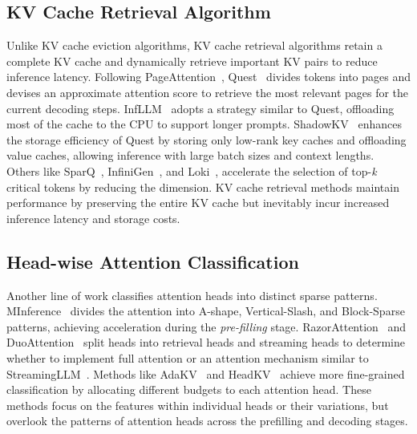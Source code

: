 \subsection{KV Cache Retrieval Algorithm}
Unlike KV cache eviction algorithms, KV cache retrieval algorithms retain a complete KV cache and dynamically retrieve important KV pairs to reduce inference latency. 
Following PageAttention~\cite{vllm}, Quest~\cite{quest} divides tokens into pages and devises an approximate attention score to retrieve the most relevant pages for the current decoding steps.
InfLLM~\cite{infllm} adopts a strategy similar to Quest, offloading most of the cache to the CPU to support longer prompts.
ShadowKV~\cite{shadowkv} enhances the storage efficiency of Quest by storing only low-rank key caches and offloading value caches, allowing inference with large batch sizes and context lengths.
Others like SparQ~\cite{sparq}, InfiniGen~\cite{infinigen}, and Loki~\cite{loki}, accelerate the selection of top-\textit{k} critical tokens by reducing the dimension. 
KV cache retrieval methods maintain performance by preserving the entire KV cache but inevitably incur increased inference latency and storage costs.

\subsection{Head-wise Attention Classification}
Another line of work classifies attention heads into distinct sparse patterns.
MInference~\cite{minference} divides the attention into A-shape, Vertical-Slash, and Block-Sparse patterns, achieving acceleration during the \emph{pre-filling} stage. RazorAttention~\cite{razorattention} and DuoAttention~\cite{duoattention} split heads into retrieval heads and streaming heads to determine whether to implement full attention or an attention mechanism similar to StreamingLLM~\cite{streamingllm}. Methods like AdaKV~\cite{adakv} and HeadKV~\cite{headkv} achieve more fine-grained classification by allocating different budgets to each attention head.
These methods focus on the features within individual heads or their variations, but overlook the patterns of attention heads across the prefilling and decoding stages.